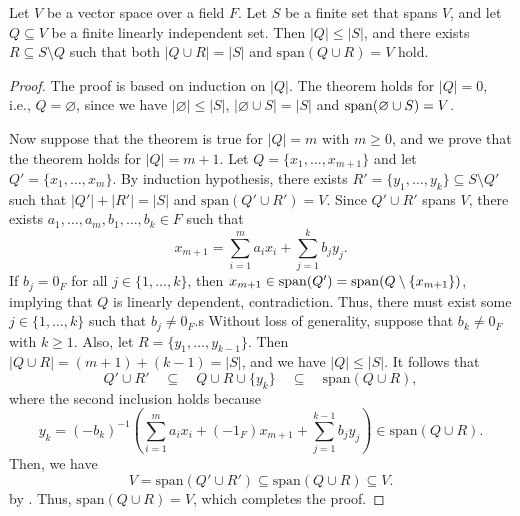 \begin{theorem}\label{thm:replacement}
  Let $V$ be a vector space over a field $F$.
  Let $S$ be a finite set that spans $V$,
  and let $Q \subseteq V$ be a finite linearly independent set.
  Then $|Q| \leq |S|$, and there exists $R \subseteq S \setminus Q$ such that
  both $|Q \cup R| = |S|$ and $\mathrm{span}(Q \cup R) = V$ hold.
\end{theorem}
\begin{proof}
  The proof is based on induction on $|Q|$.
  The theorem holds for $|Q| = 0$, i.e., $Q = \varnothing$, since we have
  $|\varnothing| \leq |S|$, $|\varnothing \cup S| = |S|$ and
  $\operatorname{span}(\varnothing \cup S) = V$.

  Now suppose that the theorem is true for $|Q| = m$ with $m \geq 0$,
  and we prove that the theorem holds for $|Q|= m + 1$.
  Let $Q = \{x_1, \dots, x_{m+1}\}$ and let $Q' = \{x_1, \dots, x_m\}$.
  By induction hypothesis, there exists
  $R' = \{y_1, \dots, y_k\} \subseteq S \setminus Q'$
  such that $|Q'| + |R'| = |S|$ and $\mathrm{span}(Q' \cup R') = V$.
  Since $Q' \cup R'$ spans $V$, there exists
  $a_1, \dots, a_m, b_1, \dots, b_k \in F$ such that
  \begin{equation*}
    x_{m+1} = \sum_{i=1}^m a_ix_i + \sum_{j=1}^k b_jy_j.
  \end{equation*}
  If $b_j = 0_F$ for all $j \in \{1, \dots, k\}$, then
  $x_{m+1} \in \operatorname{span}(Q') = \operatorname{span}(Q \setminus\{x_{m+1}\})$,
  implying that $Q$ is linearly dependent, contradiction.
  Thus, there must exist some $j \in \{1, \dots, k\}$
  such that $b_j \neq 0_F$.s
  Without loss of generality, suppose that $b_k \neq 0_F$ with $k \geq 1$.
  Also, let $R = \{y_1, \dots, y_{k-1}\}$.
  Then $|Q \cup R| = (m+1) + (k-1) = |S|$, and we have $|Q| \leq |S|$.
  It follows that
  \begin{equation*}
    Q' \cup R'
    \quad \subseteq \quad Q \cup R \cup \{y_k\}
    \quad \subseteq \quad \mathrm{span}(Q \cup R),
  \end{equation*}
  where the second inclusion holds because
  \begin{equation*}
    y_k = (-b_k)^{-1}\left(
       \sum_{i=1}^m a_ix_i + (-1_F)x_{m+1} + \sum_{j=1}^{k-1} b_jy_j
    \right) \in \mathrm{span}(Q \cup R).
  \end{equation*}
  Then, we have
  \begin{equation*}
    V = \mathrm{span}(Q' \cup R')
      \subseteq \mathrm{span}(Q \cup R)
      \subseteq V.
  \end{equation*}
  by .
  Thus, $\mathrm{span}(Q \cup R) = V$, which completes the proof.
\end{proof}

